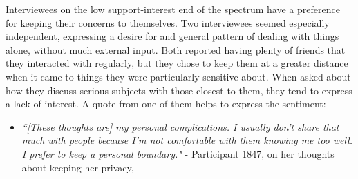   Interviewees on the low support-interest end of the spectrum
  have a preference for keeping their concerns to themselves.
  Two interviewees seemed especially independent,
  expressing a desire for and general pattern of dealing with things alone,
  without much external input.
  Both reported having plenty of friends that they interacted with regularly,
  but they chose to keep them at a greater distance when it came to things
  they were particularly sensitive about.
  When asked
  about how they discuss serious subjects with those closest to them,
  they tend to express a lack of interest.
  A quote from one of them
  helps to express the sentiment:
  \begin{itemize}
  \item
  \textit{
  ``[These thoughts are] my personal complications.
  I usually don't share that much with people because
  I'm not comfortable with them knowing me too well.
  I prefer to keep a personal boundary."
  }
  - Participant 1847, on her thoughts about keeping her privacy,
  \end{itemize}


